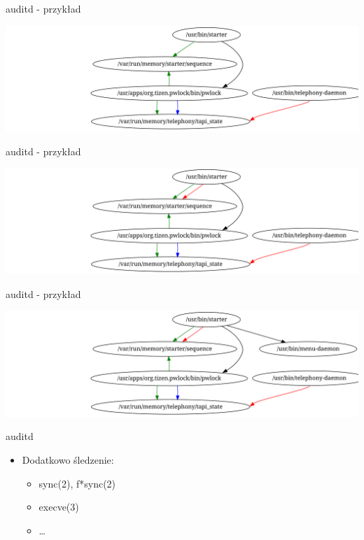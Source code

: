 \documentclass[presentation,aspectratio=43,12pt]{beamer}
\begin{document}
\begin{frame}[label=sec-6-12]{auditd - przykład}
\begin{center}
\includegraphics[width=\textwidth]{images/auditd-6}
\end{center}
\end{frame}

\begin{frame}[label=sec-6-13]{auditd - przykład}
\begin{center}
\includegraphics[width=\textwidth]{images/auditd-7}
\end{center}
\end{frame}
\begin{frame}[label=sec-6-14]{auditd - przykład}
\begin{center}
\includegraphics[width=\textwidth]{images/auditd-8}
\end{center}
\end{frame}
\begin{frame}[label=sec-6-15]{auditd}
\begin{itemize}
\item Dodatkowo śledzenie:
\begin{itemize}
\item sync(2), f*sync(2)
\item execve(3)
\item \ldots{}
\end{itemize}
\end{itemize}


\end{frame}
\end{document}

